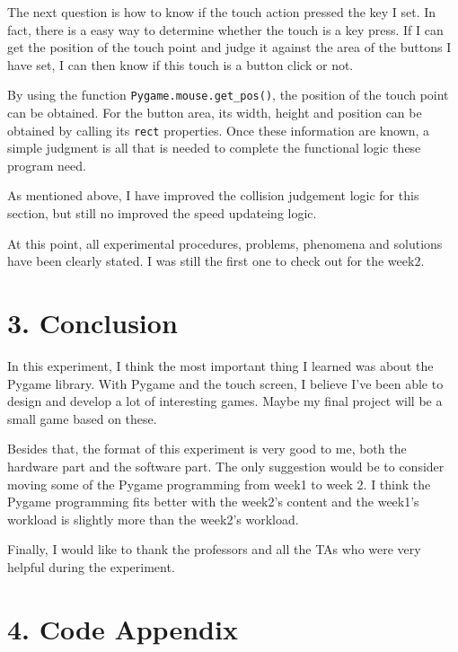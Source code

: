 \documentclass[12pt]{report}
\newcommand{\code}[1]{\colorbox{light-gray}{\texttt{#1}}}
\begin{document}
The next question is how to know if the touch action pressed the key I set. In fact, there is a easy way to determine whether the touch is a key press. If I can get the position of the touch point and judge it against the area of the buttons I have set, I can then know if this touch is a button click or not.\par
By using the function \code{Pygame.mouse.get\_pos()}, the position of the touch point can be obtained. For the button area, its width, height and position can be obtained by calling its \code{rect} properties. Once these information are known, a simple judgment is all that is needed to complete the functional logic these program need.\par
As mentioned above, I have improved the collision judgement logic for this section, but still no improved the speed updateing logic.\par
At this point, all experimental procedures, problems, phenomena and solutions have been clearly stated. I was still the first one to check out for the week2.\vspace{-1em}
\newpage
\section*{3. Conclusion}\vspace{-1em}
In this experiment, I think the most important thing I learned was about the Pygame library. With Pygame and the touch screen, I believe I've been able to design and develop a lot of interesting games. Maybe my final project will be a small game based on these.\par
Besides that, the format of this experiment is very good to me, both the hardware part and the software part. The only suggestion would be to consider moving some of the Pygame programming from week1 to week 2. I think the Pygame programming fits better with the week2's content and the week1's workload is slightly more than the week2's workload.\par
Finally, I would like to thank the professors and all the TAs who were very helpful during the experiment.
\newpage
\section*{4. Code Appendix\vspace{-1em}}
\begin{center}

\end{center}\vspace{-2em}
\end{document}
